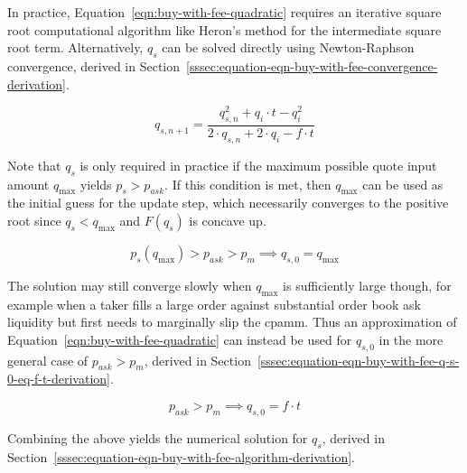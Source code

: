 \documentclass[table, twocolumn]{article}
\begin{document}
In practice, Equation~\ref{eqn:buy-with-fee-quadratic} requires an iterative square root
computational algorithm like Heron's method for the intermediate square root term.
Alternatively, $q_s$ can be solved directly using Newton-Raphson convergence, derived in
Section~\ref{sssec:equation-eqn-buy-with-fee-convergence-derivation}.

\begin{equation}\label{eqn:buy-with-fee-convergence}
	q_{s, n + 1} = \frac{q_{s, n}^2 + q_i \cdot t - q_i^2}
	{2 \cdot q_{s, n} + 2 \cdot q_i - f \cdot t}
\end{equation}

Note that $q_s$ is only required in practice if the maximum possible quote input amount
$q_{\max}$ yields $p_s > p_{ask}$. If this condition is met, then $q_{\max}$ can be used
as the initial guess for the update step, which necessarily converges to the positive
root since $q_s < q_{\max}$ and $F(q_s)$ is concave up.

\begin{equation}\label{eqn:buy-with-fee-convergence-q_s_0-eq-q_max}
	p_s(q_{\max}) > p_{ask} > p_m \implies q_{s, 0} = q_{\max}
\end{equation}

The solution may still converge slowly when $q_{\max}$ is sufficiently large though, for
example when a taker fills a large order against substantial order book ask liquidity
but first needs to marginally slip the \gls*{cpamm}. Thus an approximation of
Equation~\ref{eqn:buy-with-fee-quadratic} can instead be used for $q_{s, 0}$ in the more
general case of $p_{ask} > p_{m}$, derived in
Section~\ref{sssec:equation-eqn-buy-with-fee-q-s-0-eq-f-t-derivation}.

\begin{equation}\label{eqn:buy-with-fee-q_s_0-eq-f_t}
	p_{ask} > p_m \implies q_{s, 0} = f \cdot t
\end{equation}

Combining the above yields the numerical solution for $q_s$, derived in
Section~\ref{sssec:equation-eqn-buy-with-fee-algorithm-derivation}.
\end{document}
